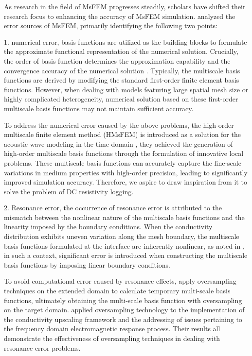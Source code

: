 \documentclass[manuscript,blind]{geophysics}
\begin{document}
As research in the field of MsFEM progresses steadily, scholars have shifted their research focus to enhancing the accuracy of MsFEM simulation. \cite{henning2014adaptive} analyzed the error sources of MsFEM, primarily identifying the following two points:

1. numerical error, basis functions are utilized as the building blocks to formulate the approximate functional representation of the numerical solution. Crucially, the order of basis function determines the approximation capability and the convergence accuracy of the numerical solution \citep{qin2024high}. Typically, the multiscale basis functions are derived by modifying the standard first-order finite element basis functions. However, when dealing with models featuring large spatial mesh size or highly complicated heterogeneity, numerical solution based on these first-order multiscale basis functions may not maintain sufficient accuracy. 

To address the numerical error caused by the above problems, the high-order multiscale finite element method (HMsFEM) is introduced as a solution for the acoustic wave modeling in the time domain \citep{gao2018high,fu2019high}, they achieved the generation of high-order multiscale basis functions through the formulation of innovative local problems. These multiscale basis functions can accurately capture the fine-scale variations in medium properties with high-order precision, leading to significantly improved simulation accuracy. Therefore, we aspire to draw inspiration from it to solve the problem of DC resistivity logging. 

2. Resonance error, the occurrence of resonance error is attributed to the mismatch between the nonlinear nature of the multiscale basis functions and the linearity imposed by the boundary conditions. When the conductivity distribution exhibits uneven variation along the mesh boundary, the multiscale basis functions formulated at the interface are inherently nonlinear, as noted in \cite{henning2013oversampling}, in such a context, significant error is introduced when constructing the multiscale basis functions by imposing linear boundary conditions.

To avoid computational error caused by resonance effects, \cite{wilhelms2018mimetic} apply oversampling techniques on the extended domain to calculate temporary multi-scale basis functions, ultimately obtaining the multi-scale basis function with oversampling on the target domain. 
\cite{caudillo2017framework,caudillo2017oversampling} applied oversampling technology to the implementation of the conductivity upscaling framework and the addressing of issues pertaining to the frequency domain electromagnetic response process. Their results all demonstrate the effectiveness of oversampling techniques in dealing with resonance error problems.
\end{document}
